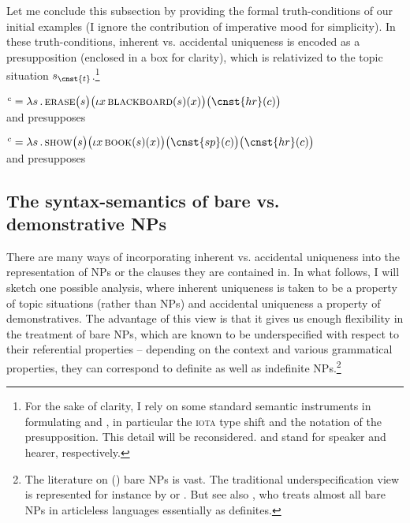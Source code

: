 \documentclass[output=paper,colorlinks,citecolor=brown,newtxmath]{langscibook}
\begin{document}
Let me conclude this subsection by providing the formal truth-conditions of our initial examples (I ignore the contribution of imperative mood for simplicity). In these truth-conditions, inherent vs. accidental uniqueness is encoded as a presupposition (enclosed in a box for clarity), which is relativized to the topic situation $s_{\cnst{t}}$.\footnote{For the sake of clarity, I rely on some standard semantic instruments in formulating  and , in particular the \textsc{iota} type shift \citep{Partee1987} and the notation of the presupposition. This detail will be reconsidered.  and  stand for speaker and hearer, respectively.}

\ea {}$^c=\lambda s\,.\,\textsc{erase}\big(s\big)\big(\iota x\,\textsc{blackboard}(s)(x)\big)\big(\cnst{hr}(c)\big)$\\
and presupposes   \label{simik:ex:blackboard-tc}
\z

\ea {}$^c=\lambda s\,.\,\textsc{show}\big(s\big)\big(\iota x\,\textsc{book}(s)(x)\big)\big(\cnst{sp}(c)\big)\big(\cnst{hr}(c)\big)$\\\label{simik:ex:kramsky-tc}
and presupposes 
\z



\subsection{The syntax-semantics of bare vs. demonstrative NPs}

There are many ways of incorporating inherent vs. accidental uniqueness into the representation of NPs or the clauses they are contained in. In what follows, I will sketch one possible analysis, where inherent uniqueness is taken to be a property of topic situations (rather than NPs) and accidental uniqueness a property of demonstratives. The advantage of this view is that it gives us enough flexibility in the treatment of bare NPs, which are known to be underspecified with respect to their referential properties -- depending on the context and various grammatical properties, they can correspond to definite as well as indefinite NPs.\footnote{The literature on () bare NPs is vast. The traditional underspecification view is represented for instance by \citet{Chierchia1998} or \citet{Geist2010}. But see also \citet{Dayal2004,Dayal2011}, who treats almost all bare NPs in articleless  languages essentially as definites.}
\end{document}
